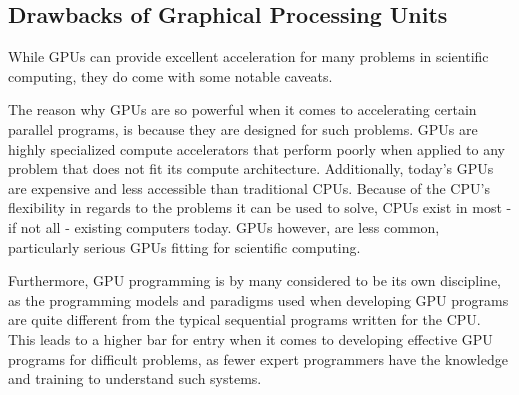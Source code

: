 \subsection{Drawbacks of Graphical Processing Units}
While GPUs can provide excellent acceleration for many problems in scientific computing, they do come with some notable caveats.

The reason why GPUs are so powerful when it comes to accelerating certain parallel programs, is because they are designed for such problems.
GPUs are highly specialized compute accelerators that perform poorly when applied to any problem that does not fit its compute architecture.
Additionally, today's GPUs are expensive and less accessible than traditional CPUs.
Because of the CPU's flexibility in regards to the problems it can be used to solve, CPUs exist in most - if not all - existing computers today.
GPUs however, are less common, particularly serious GPUs fitting for scientific computing.

Furthermore, GPU programming is by many considered to be its own discipline, as the programming models and paradigms used when developing GPU programs are quite different from the typical sequential programs written for the CPU.
This leads to a higher bar for entry when it comes to developing effective GPU programs for difficult problems, as fewer expert programmers have the knowledge and training to understand such systems.

